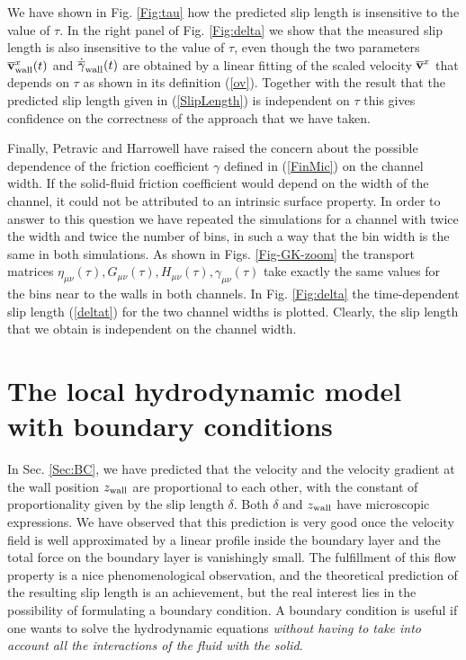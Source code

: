 \documentclass[b5paper,openright,10pt]{book}
\begin{document}
We have shown  in Fig. \ref{Fig:tau} how the predicted  slip length is
insensitive to the value of  $\tau$. In the right panel of Fig.  \ref{Fig:delta} we show
that the  measured slip  length is  also insensitive  to the  value of
$\tau$,  even though   the  two  parameters   $\overline{\bf  v}^x_{\rm
  wall}(t)$ and  $\dot{\overline{\gamma}}_{\rm wall}(t)$  are obtained
by a linear  fitting of the scaled velocity  $\overline{\bf v}^x$ that
depends on $\tau$ as shown in its definition (\ref{ov}). Together with
the result that the predicted  slip length given in (\ref{SlipLength})
is independent on  $\tau$ this gives confidence on  the correctness of
the approach that we have taken.

Finally,  Petravic and  Harrowell\cite{Petravic2007}  have raised  the
concern  about the  possible  dependence of  the friction  coefficient
$\gamma$  defined in  (\ref{FinMic})  on the  channel  width.  If  the
solid-fluid  friction coefficient  would depend  on the  width of  the
channel,  it  could   not  be  attributed  to   an  intrinsic  surface
property. In  order to answer  to this  question we have  repeated the
simulations for a channel with twice the width and twice the number of
bins,  in  such  a  way  that  the bin  width  is  the  same  in  both
simulations.   As  shown  in Figs.   \ref{Fig-GK-zoom}  the  transport
matrices
$\eta_{\mu\nu}(\tau),G_{\mu\nu}(\tau),H_{\mu\nu}(\tau),\gamma_{\mu\nu}(\tau)$
take exactly the  same values for the  bins near to the  walls in both
channels.   In Fig.   \ref{Fig:delta} the  time-dependent slip  length
(\ref{deltat}) for  the two channel  widths is plotted.   Clearly, the
slip  length that  we  obtain  is independent  on  the channel  width.

\section{The local hydrodynamic model with boundary conditions}
\label{Sec:FinalCheck}
In  Sec. \ref{Sec:BC},  we have  predicted  that the  velocity and  the
velocity gradient at the wall position $z_{\rm wall}$ are proportional
to each other, with the constant  of proportionality given by the slip
length $\delta$.   Both $\delta$  and $z_{\rm wall}$  have microscopic
expressions.  We have observed that  this prediction is very good once
the velocity field is well approximated by a linear profile inside the
boundary  layer  and  the  total   force  on  the  boundary  layer  is
vanishingly small.   The fulfillment of  this flow property is  a nice
phenomenological observation,  and the  theoretical prediction  of the
resulting slip  length is  an achievement,  but the  real interest
lies  in  the  possibility  of formulating  a  boundary  condition.  A
boundary condition  is useful if  one wants to solve  the hydrodynamic
equations  \textit{without  having  to   take  into  account  all  the
  interactions of the fluid with the solid}.
\end{document}
